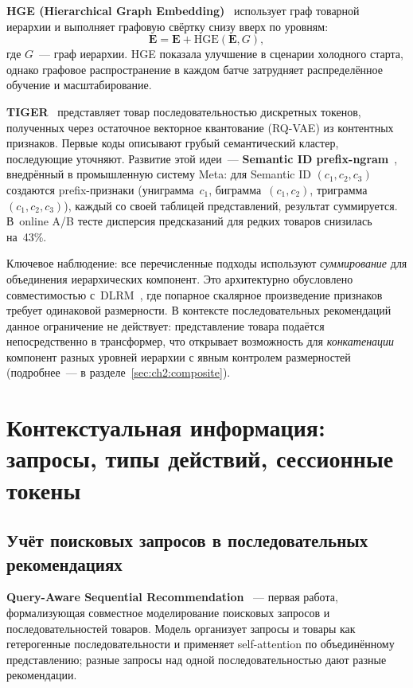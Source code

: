 \textbf{HGE (Hierarchical Graph Embedding)}~\cite{serov2020hge} использует граф товарной иерархии и выполняет графовую свёртку снизу вверх по уровням:
\begin{equation}
    \mathbf{E} = \mathbf{E} + \mathrm{HGE}(\mathbf{E}, G),
\end{equation}
где $G$~--- граф иерархии. HGE показала улучшение в сценарии холодного старта, однако графовое распространение в каждом батче затрудняет распределённое обучение и масштабирование.

\textbf{TIGER}~\cite{rajput2023tiger} представляет товар последовательностью дискретных токенов, полученных через остаточное векторное квантование (RQ-VAE) из контентных признаков. Первые коды описывают грубый семантический кластер, последующие уточняют. Развитие этой идеи~--- \textbf{Semantic ID prefix-ngram}~\cite{zheng2025semanticid}, внедрённый в промышленную систему Meta: для Semantic ID $(c_1, c_2, c_3)$ создаются prefix-признаки (униграмма~$c_1$, биграмма~$(c_1, c_2)$, триграмма~$(c_1, c_2, c_3)$), каждый со своей таблицей представлений, результат суммируется. В~online A/B тесте дисперсия предсказаний для редких товаров снизилась на~43\%.

Ключевое наблюдение: все перечисленные подходы используют \emph{суммирование} для объединения иерархических компонент. Это архитектурно обусловлено совместимостью с~DLRM~\cite{naumov2019dlrm}, где попарное скалярное произведение признаков требует одинаковой размерности. В контексте последовательных рекомендаций данное ограничение не действует: представление товара подаётся непосредственно в трансформер, что открывает возможность для \emph{конкатенации} компонент разных уровней иерархии с явным контролем размерностей (подробнее~--- в разделе~\ref{sec:ch2:composite}).

\section{Контекстуальная информация: запросы, типы действий, сессионные токены}
\label{sec:ch1:context}

\subsection{Учёт поисковых запросов в последовательных рекомендациях}
\label{subsec:ch1:queries}

\textbf{Query-Aware Sequential Recommendation} \cite{he2022queryaware}~--- первая работа, формализующая совместное моделирование поисковых запросов и последовательностей товаров. Модель организует запросы и товары как гетерогенные последовательности и применяет self-attention по объединённому представлению; разные запросы над одной последовательностью дают разные рекомендации.

